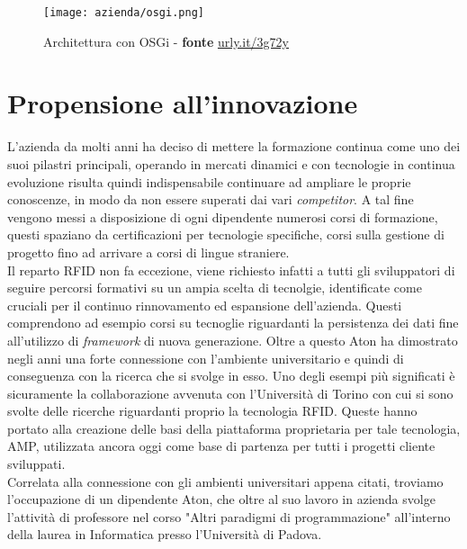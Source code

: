 \begin{figure}[!ht] 
    \centering 
    \texttt{[image: azienda/osgi.png]} 
    \caption{Architettura con OSGi - \textbf{fonte} \url{urly.it/3g72y}}
    \label{osgi_example}
\end{figure}

\section{Propensione all'innovazione}

L'azienda da molti anni ha deciso di mettere la formazione continua come uno dei suoi pilastri principali, operando in mercati dinamici e con tecnologie in
continua evoluzione risulta quindi indispensabile continuare ad ampliare le proprie conoscenze, in modo da non essere superati dai vari \emph{competitor}.
A tal fine vengono messi a disposizione di ogni dipendente numerosi corsi di formazione, questi spaziano da certificazioni per tecnologie specifiche, corsi
sulla gestione di progetto fino ad arrivare a corsi di lingue straniere. \\
Il reparto RFID non fa eccezione, viene richiesto infatti a tutti gli sviluppatori di seguire percorsi formativi su un ampia scelta di tecnolgie,
identificate come cruciali per il continuo rinnovamento ed espansione dell'azienda. Questi comprendono ad esempio corsi su tecnoglie riguardanti la persistenza
dei dati fine all'utilizzo di \emph{framework} di nuova generazione.
Oltre a questo Aton ha dimostrato negli anni una forte connessione con l'ambiente universitario e quindi di conseguenza con la ricerca che si svolge in esso.
Uno degli esempi più significati è sicuramente la collaborazione avvenuta con l'Università di Torino con cui si sono svolte delle ricerche riguardanti proprio
la tecnologia RFID. Queste hanno portato alla creazione delle basi della piattaforma proprietaria per tale tecnologia, AMP, utilizzata ancora oggi come base di
partenza per tutti i progetti cliente sviluppati. \\
Correlata alla connessione con gli ambienti universitari appena citati, troviamo l'occupazione di un dipendente Aton, che oltre al suo lavoro in azienda svolge
l'attività di professore nel corso "Altri paradigmi di programmazione" all'interno della laurea in Informatica presso l'Università di Padova. 


